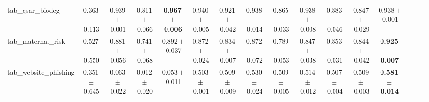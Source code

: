 \documentclass[8pt]{extarticle}
\begin{document}
\begin{longtable}{l*{14}{c}}
tab\_qsar\_biodeg & 0.363\,$\pm$\,0.113 & 0.939\,$\pm$\,0.001 & 0.811\,$\pm$\,0.066 & \textbf{0.967\,$\pm$\,0.006} & 0.940\,$\pm$\,0.005 & 0.921\,$\pm$\,0.042 & 0.938\,$\pm$\,0.014 & 0.865\,$\pm$\,0.033 & 0.938\,$\pm$\,0.008 & 0.883\,$\pm$\,0.046 & 0.847\,$\pm$\,0.029 & 0.938\,$\pm$\,0.001 & -- & -- \\
tab\_maternal\_risk & 0.527\,$\pm$\,0.550 & 0.881\,$\pm$\,0.056 & 0.741\,$\pm$\,0.068 & 0.892\,$\pm$\,0.037 & 0.872\,$\pm$\,0.024 & 0.834\,$\pm$\,0.007 & 0.872\,$\pm$\,0.072 & 0.789\,$\pm$\,0.053 & 0.847\,$\pm$\,0.038 & 0.853\,$\pm$\,0.031 & 0.844\,$\pm$\,0.042 & \textbf{0.925\,$\pm$\,0.007} & -- & -- \\
tab\_website\_phishing & 0.351\,$\pm$\,0.645 & 0.063\,$\pm$\,0.022 & 0.012\,$\pm$\,0.020 & 0.053\,$\pm$\,0.011 & 0.503\,$\pm$\,0.001 & 0.509\,$\pm$\,0.009 & 0.530\,$\pm$\,0.024 & 0.509\,$\pm$\,0.005 & 0.514\,$\pm$\,0.012 & 0.507\,$\pm$\,0.004 & 0.509\,$\pm$\,0.003 & \textbf{0.581\,$\pm$\,0.014} & -- & -- \\
\end{longtable}
\end{document}
